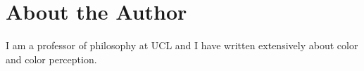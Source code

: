 \documentclass[12pt]{article}
\begin{document}

\section{About the Author} %
\label{sec:about_the_author}

I am a professor of philosophy at UCL and I have written extensively about color and color perception.

\end{document}
